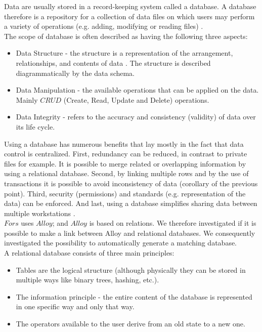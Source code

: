 \documentclass[oneside]{book}
\begin{document}
Data are usually stored in a record-keeping system called a database. A database therefore is a repository for a collection of data files on which users may perform a variety of operations (e.g. adding, modifying or reading files) \cite[p.~11]{introtodb}.\\

The scope of database is often described as having the following three aspects:
\begin{itemize}
  \item Data Structure - the structure is a representation of the arrangement, relationships, and contents of data \cite{datastruct}. The structure is described diagrammatically by the data schema.  
  \item Data Manipulation - the available operations that can be applied on the data. Mainly $CRUD$ (Create, Read, Update and Delete) operations.
  \item Data Integrity - refers to the accuracy and consistency (validity) of data over its life cycle.
\end{itemize}

Using a database has numerous benefits that lay mostly in the fact that data control is centralized. First, redundancy can be reduced, in contrast to private files for example. It is possible to merge related or overlapping information by using a relational database. Second, by linking multiple rows and by the use of transactions it is possible to avoid inconsistency of data (corollary of the previous point). Third, security (permissions) and standards (e.g. representation of the data) can be enforced. And last, using a database simplifies sharing data between multiple workstations \cite[p.~16]{introtodb}.\\

$Fors$ uses $Alloy$; and $Alloy$ is based on relations. We therefore investigated if it is possible to make a link between Alloy and relational databases. We consequently investigated the possibility to automatically generate a matching database. \\

A relational database consists of three main principles:
\begin{itemize}
	\item Tables are the logical structure (although physically they can be stored in multiple ways like binary trees, hashing, etc.). 
	\item The information principle - the entire content of the database is represented in one specific way and only that way. 
	\item The operators available to the user derive from an old state to a new one.
\end{itemize}
\end{document}
